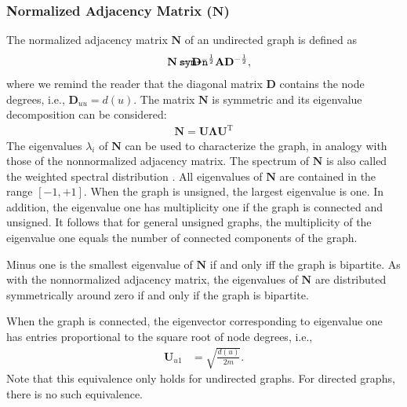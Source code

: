 \documentclass{article}
\def\mathnote#1{%
  \tag*{\rlap{\hspace\marginparsep\smash{\parbox[t]{\marginparwidth}{#1}}}}
}
\begin{document}
\subsubsection{Normalized Adjacency Matrix ($\mathbf N$)}
\label{sec:matrix.N}
The normalized adjacency matrix $\mathbf N$ of an undirected graph is
defined as 
\begin{align}
  \mathnote{\texttt{sym-n}}
  \mathbf N &= \mathbf D^{-\frac 1 2} \mathbf A \mathbf D^{-\frac 1 2},
\end{align}
where we remind the reader that the diagonal matrix $\mathbf D$
contains the node degrees, i.e., $\mathbf D_{uu} = d(u)$. 
The matrix $\mathbf N$ is symmetric and its eigenvalue decomposition can
be considered:
\begin{align}
  \mathbf N = \mathbf U \mathbf \Lambda \mathbf U^{\mathrm T}
\end{align}
The eigenvalues $\lambda_i$ of $\mathbf N$ can be used to characterize
the graph, in analogy with those of the nonnormalized adjacency
matrix.
The spectrum of $\mathbf N$ is also called the weighted spectral
distribution \citep{b864}.
All eigenvalues of $\mathbf N$ are contained in the range
$[-1,+1]$.  When the graph is unsigned, the largest eigenvalue is one.
In addition, the eigenvalue one has multiplicity one if the graph is
connected and unsigned.  It follows that for general unsigned graphs,
the multiplicity of the eigenvalue one equals the number of connected
components of the graph. 

Minus one is the smallest eigenvalue of $\mathbf N$ if and only iff the graph is
bipartite.  As with the nonnormalized adjacency matrix, the eigenvalues
of $\mathbf N$ are distributed symmetrically around zero if and only if
the graph is bipartite. 

When the graph is connected, 
the eigenvector corresponding to eigenvalue one has entries proportional
to the square root of node degrees, i.e.,
\begin{align}
  \mathbf U_{u1} &= \sqrt{\frac{d(u)}{2m}}.
\end{align}
Note that this equivalence only holds for undirected graphs.  For
directed graphs, there is no such equivalence. 
\end{document}
